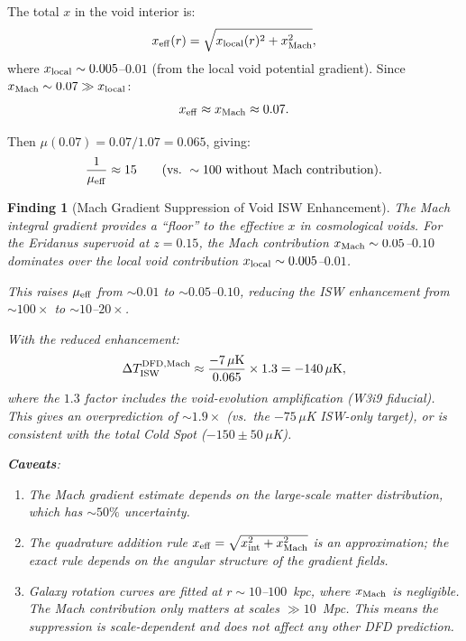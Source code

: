 \documentclass[11pt]{article}
\newtheorem{finding}{Finding}
\newcommand{\mufd}{\mu}
\begin{document}
The total $x$ in the void interior is:
\begin{equation}
x_{\rm eff}(r) = \sqrt{x_{\rm local}(r)^2 + x_{\rm Mach}^2},
\end{equation}
where $x_{\rm local} \sim 0.005$--$0.01$ (from the local void
potential gradient). Since $x_{\rm Mach} \sim 0.07 \gg x_{\rm local}$:
\begin{equation}
x_{\rm eff} \approx x_{\rm Mach} \approx 0.07.
\end{equation}

Then $\mufd(0.07) = 0.07/1.07 = 0.065$, giving:
\begin{equation}
\frac{1}{\mufd_{\rm eff}} \approx 15
\qquad (\text{vs.\ } \sim 100 \text{ without Mach contribution}).
\end{equation}

\begin{finding}[Mach Gradient Suppression of Void ISW Enhancement]
\label{find:mach-suppression}
The Mach integral gradient provides a ``floor'' to the effective $x$
in cosmological voids. For the Eridanus supervoid at $z = 0.15$,
the Mach contribution $x_{\rm Mach} \sim 0.05$--$0.10$ dominates
over the local void contribution $x_{\rm local} \sim 0.005$--$0.01$.

This raises $\mufd_{\rm eff}$ from $\sim 0.01$ to $\sim 0.05$--$0.10$,
reducing the ISW enhancement from $\sim 100\times$ to $\sim 10$--$20\times$.

With the reduced enhancement:
\begin{equation}
\Delta T_{\rm ISW}^{\rm DFD,Mach} \approx \frac{-7\,\mu\text{K}}{0.065}
\times 1.3 = -140\,\mu\text{K},
\end{equation}
where the $1.3$ factor includes the void-evolution amplification
(W3i9 fiducial). This gives an overprediction of $\sim 1.9\times$
(vs.\ the $-75\,\mu$K ISW-only target), or is \emph{consistent} with
the total Cold Spot ($-150 \pm 50\,\mu$K).

\textbf{Caveats}:
\begin{enumerate}[nosep]
\item The Mach gradient estimate depends on the large-scale matter
  distribution, which has $\sim 50\%$ uncertainty.
\item The quadrature addition rule $x_{\rm eff} = \sqrt{x_{\rm int}^2
  + x_{\rm Mach}^2}$ is an approximation; the exact rule depends on
  the angular structure of the gradient fields.
\item Galaxy rotation curves are fitted at $r \sim 10$--$100$~kpc,
  where $x_{\rm Mach}$ is negligible. The Mach contribution only
  matters at scales $\gg 10$~Mpc. This means the suppression is
  scale-dependent and does not affect any other DFD prediction.
\end{enumerate}
\end{finding}
\end{document}
